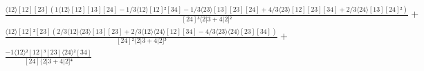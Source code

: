 \documentclass[varwidth, border=5pt]{standalone}
\begin{document}
\begin{my}
$\begin{gathered}
\scriptscriptstyle\frac{⟨12⟩[12][23](1⟨12⟩[12][13][24]-1/3⟨12⟩[12]²[34]-1/3⟨23⟩[13][23][24]+4/3⟨23⟩[12][23][34]+2/3⟨24⟩[13][24]²)}{[24]³⟨2|3+4|2]²} +\\
\scriptscriptstyle\frac{⟨12⟩[12]²[23](2/3⟨12⟩⟨23⟩[13][23]+2/3⟨12⟩⟨24⟩[12][34]-4/3⟨23⟩⟨24⟩[23][34])}{[24]²⟨2|3+4|2]³} +\\
\scriptscriptstyle\frac{-1⟨12⟩²[12]³[23]⟨24⟩²[34]}{[24]⟨2|3+4|2]⁴} \phantom{+}
\end{gathered}$
\end{my}
\end{document}
